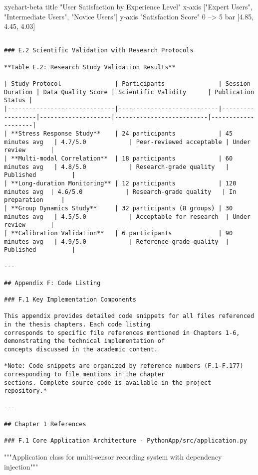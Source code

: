 \documentclass[12pt,a4paper]{report}
\begin{document}
xychart-beta
    title "User Satisfaction by Experience Level"
    x-axis ["Expert Users", "Intermediate Users", "Novice Users"]
    y-axis "Satisfaction Score" 0 --> 5
    bar [4.85, 4.45, 4.03]
\begin{verbatim}

### E.2 Scientific Validation with Research Protocols

**Table E.2: Research Study Validation Results**

| Study Protocol               | Participants               | Session Duration | Data Quality Score | Scientific Validity      | Publication Status |
|------------------------------|----------------------------|------------------|--------------------|--------------------------|--------------------|
| **Stress Response Study**    | 24 participants            | 45 minutes avg   | 4.7/5.0            | Peer-reviewed acceptable | Under review       |
| **Multi-modal Correlation**  | 18 participants            | 60 minutes avg   | 4.8/5.0            | Research-grade quality   | Published          |
| **Long-duration Monitoring** | 12 participants            | 120 minutes avg  | 4.6/5.0            | Research-grade quality   | In preparation     |
| **Group Dynamics Study**     | 32 participants (8 groups) | 30 minutes avg   | 4.5/5.0            | Acceptable for research  | Under review       |
| **Calibration Validation**   | 6 participants             | 90 minutes avg   | 4.9/5.0            | Reference-grade quality  | Published          |

---

## Appendix F: Code Listing

### F.1 Key Implementation Components

This appendix provides detailed code snippets for all files referenced in the thesis chapters. Each code listing
corresponds to specific file references mentioned in Chapters 1-6, demonstrating the technical implementation of
concepts discussed in the academic content.

*Note: Code snippets are organized by reference numbers (F.1-F.177) corresponding to file mentions in the chapter
sections. Complete source code is available in the project repository.*

---

## Chapter 1 References

### F.1 Core Application Architecture - PythonApp/src/application.py

\end{verbatim}
"""Application class for multi-sensor recording system with dependency injection"""
\end{document}
